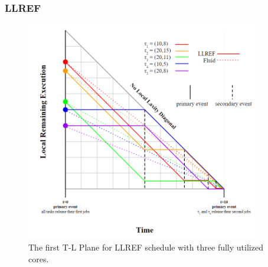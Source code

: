 \documentclass[conference,compsoc]{IEEEtran}
\begin{document}
\subsubsection{LLREF}
\begin{figure}
\includegraphics[width=4in]{LLREF.png}
\caption{The first T-L Plane for LLREF schedule with three fully utilized cores.}
\label{fig_llref}
\end{figure}
\end{document}
